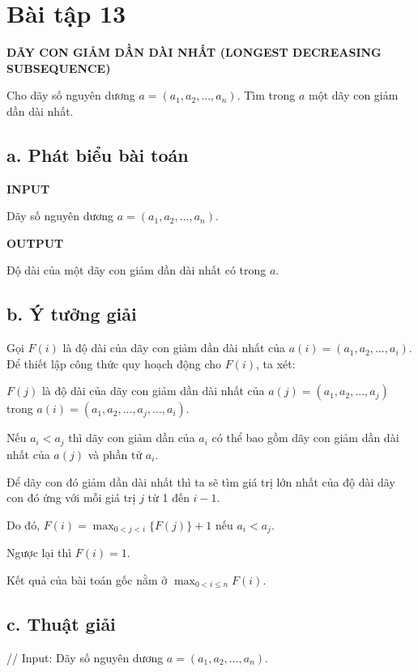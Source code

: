\documentclass[12pt, a4paper, fleqn]{article}
\begin{document}
	\section*{Bài tập 13} 
	
	\textbf{DÃY CON GIẢM DẦN DÀI NHẤT (LONGEST DECREASING SUBSEQUENCE)}
	
	
	Cho dãy số nguyên dương $a = (a_1, a_2, ..., a_n)$. Tìm trong $a$ một dãy con giảm dần dài nhất.
	
	\subsection*{a. Phát biểu bài toán}
	
	\textbf{INPUT}
	
	Dãy số nguyên dương $a = (a_1, a_2, ..., a_n)$.
	
	\textbf{OUTPUT}
	
	Độ dài của một dãy con giảm dần dài nhất có trong $a$.
	
	\subsection*{b. Ý tưởng giải}
	
	Gọi $F(i)$ là độ dài của dãy con giảm dần dài nhất của $a(i) = (a_1, a_2, ..., a_i)$. Để thiết lập công thức quy hoạch động cho $F(i)$, ta xét:
	
	$F(j)$ là độ dài của dãy con giảm dần dài nhất của $a(j) = (a_1, a_2, ..., a_j)$ trong $a(i) = (a_1, a_2, ..., a_j, ..., a_i)$.
	
	Nếu $a_i < a_j$ thì dãy con giảm dần của $a_i$ có thể bao gồm dãy con giảm dần dài nhất của $a(j)$ và phần tử $a_i$.
	
	Để dãy con đó giảm dần dài nhất thì ta sẽ tìm giá trị lớn nhất của độ dài dãy con đó ứng với mỗi giá trị $j$ từ 1 đến $i - 1$. 
	
	Do đó, $\displaystyle F(i) = \max_{0 < j < i}\{F(j)\} + 1$ nếu $a_i < a_j$.
	
	Ngược lại thì $F(i) = 1$.
	
	Kết quả của bài toán gốc nằm ở $\displaystyle \max_{0 < i \leq n} F(i)$.
	
	\subsection*{c. Thuật giải}
	
	// Input: Dãy số nguyên dương $a = (a_1, a_2, ..., a_n)$.
	
\end{document}
